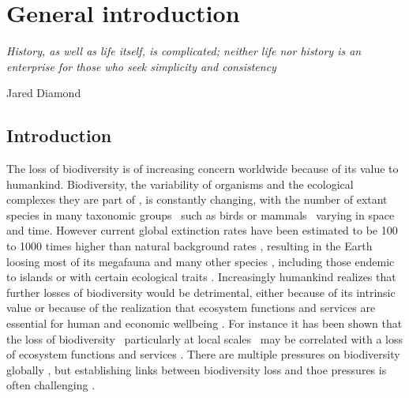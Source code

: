 \chapter{General introduction}
\epigraph{\emph{History, as well as life itself, is complicated; neither life nor history is an enterprise for those who seek simplicity and consistency}}{Jared Diamond}
\label{C01}

\section{Introduction}
\label{C01_01}

The loss of biodiversity is of increasing concern worldwide because of its value to humankind. Biodiversity, the variability of organisms and the ecological complexes they are part of \citep{SecretariatoftheConventiononBiologicalDiversity2014}, is constantly changing, with the number of extant species in many taxonomic groups \textendash\ such as birds \citep{Jetz2012} or mammals \citep{Upham2019} \textendash\ varying in space and time. However current global extinction rates have been estimated to be 100 to 1000 times higher than natural background rates \citep{Pimm2014}, resulting in the Earth loosing most of its megafauna and many other species \citep{Sandom2014,Ceballos2017,Hallmann2017}, including those endemic to islands \citep{Blackburn2004} or with certain ecological traits \citep{Fritz2009}. Increasingly humankind realizes that further losses of biodiversity would be detrimental, either because of its intrinsic value or because of the realization that ecosystem functions and services are essential for human and economic wellbeing \citep{Cardinale2012,Mace2014}. For instance it has been shown that the loss of biodiversity \textendash\ particularly at local scales \textendash\ may be correlated with a loss of ecosystem functions and services \citep{Albrecht2014,Oliver2015,Hautier2015,Isbell2015}. There are multiple pressures on biodiversity globally \citep{Butchart2010,Steffen2015}, but establishing links between biodiversity loss and thoe pressures is often challenging \citep{Cardinale2018,DePalma2018}.

